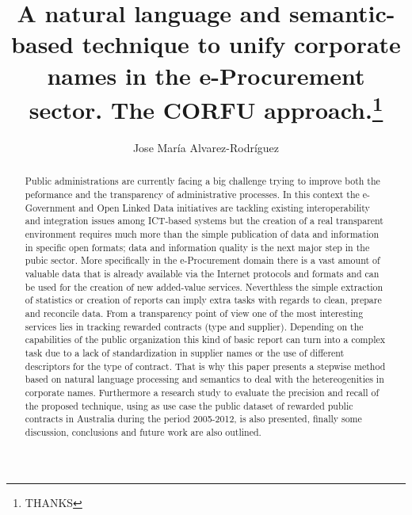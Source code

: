 \documentclass{llncs}
\begin{document}
\title{A natural language and semantic-based technique to unify corporate names in the e-Procurement sector. The CORFU approach.\thanks{THANKS}}

\titlerunning{}

\author{Jose Mar\'{i}a Alvarez-Rodr\'{i}guez} 







\date{}

\maketitle

\renewcommand{\labelitemi}{$\bullet$}

\begin{abstract}
Public administrations are currently facing a big challenge trying to improve both the peformance and the transparency of administrative processes.
In this context the e-Government and Open Linked Data initiatives are tackling existing interoperability and 
integration issues among ICT-based systems but the creation of a real transparent environment requires 
much more than the simple publication of data and information in specific open formats; data and information 
quality is the next major step in the pubic sector. More specifically in the e-Procurement domain there is a 
vast amount of valuable data that is already available via the Internet protocols and formats and can be used 
for the creation of new added-value services. Neverthless the simple extraction of statistics or creation of reports 
can imply extra tasks with regards to clean, prepare and reconcile data. 
From a transparency point of view one of the most interesting services lies in tracking rewarded contracts (type and supplier). 
Depending on the capabilities of the public organization this kind of basic report can turn into a 
complex task due to a lack of standardization in supplier names or the use of different descriptors for the type of contract. That is why 
this paper presents a stepwise method based on natural language processing and semantics to deal with the hetereogenities in corporate names. 
Furthermore a research study to evaluate the precision and recall of the proposed technique, using as use case the public dataset of rewarded public 
contracts in Australia during the period 2005-2012, is also presented, finally some discussion, conclusions and future work 
are also outlined.
\end{abstract}
\end{document}
